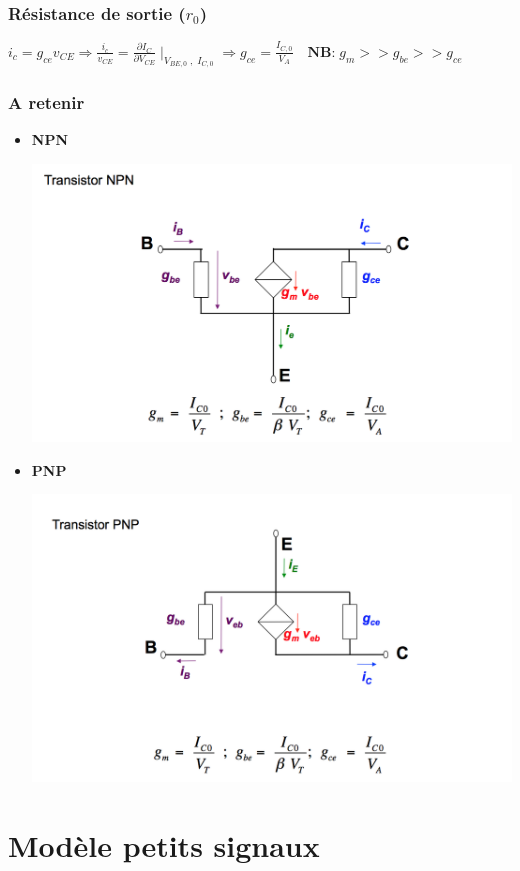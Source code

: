 \documentclass[]{article}
\begin{document}
\subsubsection{Résistance de sortie ($r_0$)}
$i_c = g_{ce}v_{CE} \Rightarrow  \frac{i_c}{v_{CE}} = \frac{\partial I_C}{\partial V_{CE}}\mid_{V_{BE,0}\;,\;I_{C,0}} \Rightarrow g_{ce} = \frac{I_{C,0}}{V_A} \quad \textbf{NB:} \; g_m >> g_{be} >> g_{ce}$
\subsubsection{A retenir}
\begin{itemize}
\item \textbf{NPN}

\includegraphics[scale=0.5]{aretenir_npn}

\item \textbf{PNP}

\includegraphics[scale=0.5]{aretenir_pnp}
\end{itemize}

\section{Modèle petits signaux}
\end{document}

